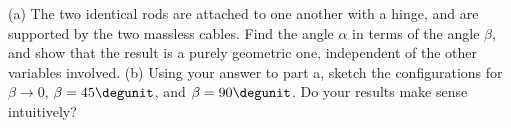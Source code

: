 (a) The two identical rods are attached to one another with a hinge, and
are supported by the two massless cables. Find the angle $\alpha$ in terms of the
angle $\beta$, and show that the result is a purely geometric one, independent of
the other variables involved.\answercheck\hwendpart
(b) Using your answer to part a, sketch the configurations for $\beta\rightarrow 0$,
$\beta= 45\degunit$, and $\beta= 90\degunit$. Do your results
make sense intuitively?
